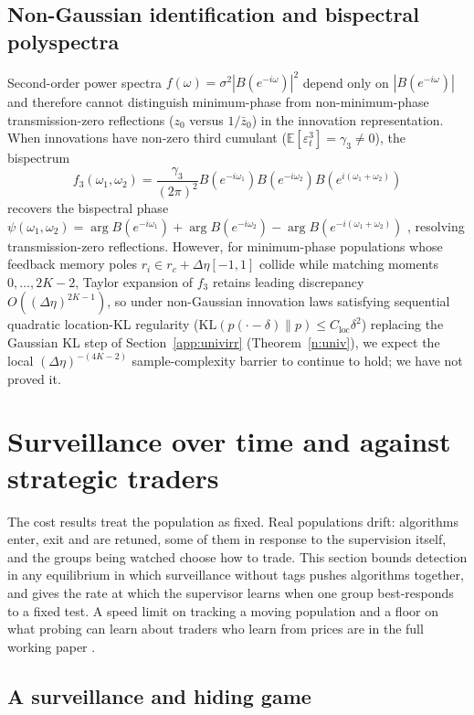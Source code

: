 \documentclass[12pt]{article}
\theoremstyle{definition}
\theoremstyle{remark}
\newcommand{\E}{\mathbb{E}}
\begin{document}
\subsection{Non-Gaussian identification and bispectral polyspectra}\label{sec:bispectrum}
Second-order power spectra $f(\omega) = \sigma^2 |B(e^{-i\omega})|^2$ depend only on $|B(e^{-i\omega})|$ and therefore cannot distinguish minimum-phase from non-minimum-phase transmission-zero reflections ($z_0$ versus $1/\bar{z}_0$) in the innovation representation. When innovations have non-zero third cumulant ($\E[\varepsilon_t^3] = \gamma_3 \neq 0$), the bispectrum
\[
  f_3(\omega_1, \omega_2) = \frac{\gamma_3}{(2\pi)^2} B(e^{-i\omega_1}) B(e^{-i\omega_2}) B(e^{i(\omega_1 + \omega_2)})
\]
recovers the bispectral phase $\psi(\omega_1, \omega_2) = \arg B(e^{-i\omega_1}) + \arg B(e^{-i\omega_2}) - \arg B(e^{-i(\omega_1 + \omega_2)})$ \citep{brillinger1965,hinich1982}, resolving transmission-zero reflections. However, for minimum-phase populations whose feedback memory poles $r_i \in r_c + \Delta\eta[-1, 1]$ collide while matching moments $0, \dots, 2K-2$, Taylor expansion of $f_3$ retains leading discrepancy $O((\Delta\eta)^{2K-1})$, so under non-Gaussian innovation laws satisfying sequential quadratic location-KL regularity ($\mathrm{KL}(p(\cdot - \delta)\|p) \le C_{\mathrm{loc}}\delta^2$) replacing the Gaussian KL step of Section~\ref{app:univirr} (Theorem~\ref{n:univ}), we expect the local $(\Delta\eta)^{-(4K-2)}$ sample-complexity barrier to continue to hold; we have not proved it.

\section{Surveillance over time and against strategic traders}\label{app:dynamic}

The cost results treat the population as fixed. Real populations drift: algorithms enter, exit and are retuned, some of them in response to the supervision itself, and the groups being watched choose how to trade. This section bounds detection in any equilibrium in which surveillance without tags pushes algorithms together, and gives the rate at which the supervisor learns when one group best-responds to a fixed test. A speed limit on tracking a moving population and a floor on what probing can learn about traders who learn from prices are in the full working paper \citep{niroula2026full}.

\subsection{A surveillance and hiding game}
\end{document}
